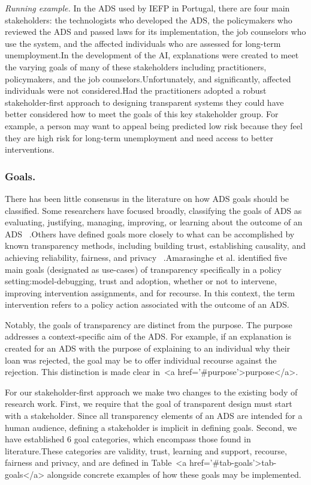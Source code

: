 \documentclass[sigconf, nonacm]{acmart}
\begin{document}
\emph{Running example.} In the ADS used by IEFP in Portugal, there are four main stakeholders: the technologists who developed the ADS, the policymakers who reviewed the ADS and passed laws for its implementation, the job counselors who use the system, and the affected individuals who are assessed for long-term unemployment.In the development of the AI, explanations were created to meet the varying goals of many of these stakeholders including practitioners, policymakers, and the job counselors.Unfortunately, and significantly, affected individuals were not considered.Had the practitioners adopted a robust stakeholder-first approach to designing transparent systems they could have better considered how to meet the goals of this key stakeholder group. For example, a person may want to appeal being predicted low risk because they feel they are high risk for long-term unemployment and need access to better interventions.

\subsubsection{Goals.} There has been little consensus in the literature on how ADS goals should be classified. Some researchers have focused broadly, classifying the goals of ADS as evaluating, justifying, managing, improving, or learning about the outcome of an ADS ~\cite{meske}.Others have defined goals more closely to what can be accomplished by known transparency methods, including building trust, establishing causality, and achieving reliability, fairness, and privacy ~\cite{DBLP:journals/corr/abs-2012-01805}.Amarasinghe et al. identified five main goals (designated as use-cases) of transparency specifically in a policy setting:model-debugging, trust and adoption, whether or not to intervene, improving intervention assignments, and for recourse. In this context, the term intervention refers to a policy action associated with the outcome of an ADS.

Notably, the goals of transparency are distinct from the purpose. The purpose addresses a context-specific aim of the ADS. For example, if an explanation is created for an ADS with the purpose of explaining to an individual why their loan was rejected, the goal may be to offer individual recourse against the rejection. This distinction is made clear in~<a href='#purpose'>purpose</a>.

For our stakeholder-first approach we make two changes to the existing body of research work. First, we require that the goal of transparent design must start with a stakeholder. Since all transparency elements of an ADS are intended for a human audience, defining a stakeholder is implicit in defining goals. Second, we have established 6 goal categories, which encompass those found in literature.These categories are validity, trust, learning and support, recourse, fairness and privacy, and are defined in Table~<a href='#tab-goals'>tab-goals</a> alongside concrete examples of how these goals may be implemented.
\end{document}
